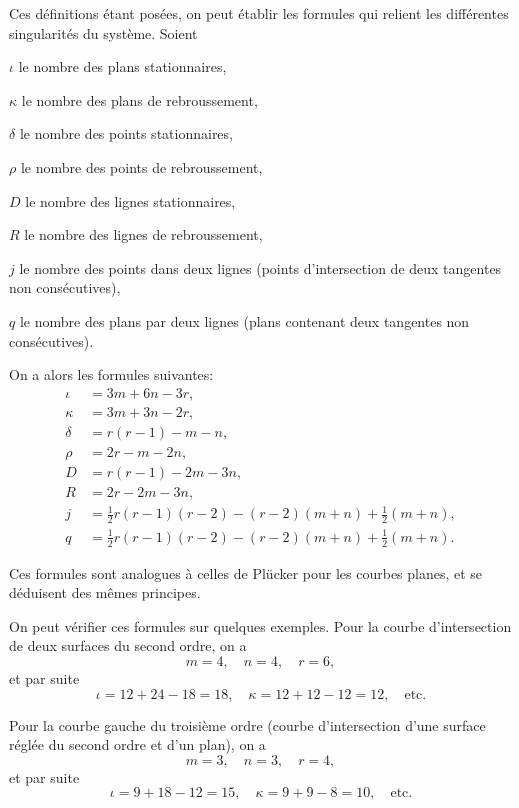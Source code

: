 \documentclass[11pt,a4paper]{book}
\begin{document}
\newpage
\setcounter{page}{210}

Ces d\'{e}finitions \'{e}tant pos\'{e}es, on peut \'{e}tablir les formules qui relient les diff\'{e}rentes
singularit\'{e}s du syst\`{e}me. Soient

$\iota$ le nombre des plans stationnaires,

$\kappa$ le nombre des plans de rebroussement,

$\delta$ le nombre des points stationnaires,

$\rho$ le nombre des points de rebroussement,

$D$ le nombre des lignes stationnaires,

$R$ le nombre des lignes de rebroussement,

$j$ le nombre des points dans deux lignes (points d'intersection de deux tangentes non
cons\'{e}cutives),

$q$ le nombre des plans par deux lignes (plans contenant deux tangentes non cons\'{e}cutives).

\newpage
\setcounter{page}{211}

On a alors les formules suivantes:
\begin{align*}
\iota &= 3m + 6n - 3r,\\
\kappa &= 3m + 3n - 2r,\\
\delta &= r(r-1) - m - n,\\
\rho &= 2r - m - 2n,\\
D &= r(r-1) - 2m - 3n,\\
R &= 2r - 2m - 3n,\\
j &= \tfrac{1}{2}r(r-1)(r-2) - (r-2)(m+n) + \tfrac{1}{2}(m+n),\\
q &= \tfrac{1}{2}r(r-1)(r-2) - (r-2)(m+n) + \tfrac{1}{2}(m+n).
\end{align*}

Ces formules sont analogues \`{a} celles de Pl\"{u}cker pour les courbes planes, et se d\'{e}duisent
des m\^{e}mes principes.

\newpage
\setcounter{page}{212}

On peut v\'{e}rifier ces formules sur quelques exemples. Pour la courbe d'intersection
de deux surfaces du second ordre, on a
\[
m = 4, \quad n = 4, \quad r = 6,
\]
et par suite
\[
\iota = 12 + 24 - 18 = 18, \quad \kappa = 12 + 12 - 12 = 12, \quad \text{etc.}
\]

Pour la courbe gauche du troisi\`{e}me ordre (courbe d'intersection d'une surface r\'{e}gl\'{e}e
du second ordre et d'un plan), on a
\[
m = 3, \quad n = 3, \quad r = 4,
\]
et par suite
\[
\iota = 9 + 18 - 12 = 15, \quad \kappa = 9 + 9 - 8 = 10, \quad \text{etc.}
\]
\end{document}
